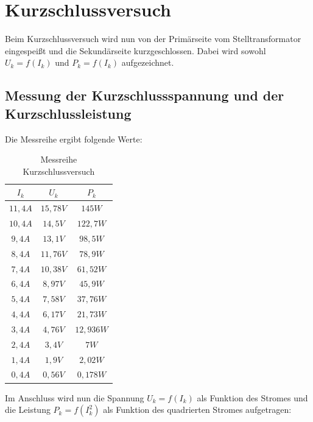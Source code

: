 \documentclass{article}
\begin{document}
\section{Kurzschlussversuch}
\label{sec:kurzschlussversuch}

Beim Kurzschlussversuch wird nun von der Primärseite vom Stelltransformator eingespeißt und die Sekundärseite kurzgeschlossen. Dabei wird sowohl $U_{k} = f(I_{k})$ und $P_{k} = f(I_{k})$ aufgezeichnet.

\subsection{Messung der Kurzschlussspannung und der Kurzschlussleistung}
\label{sec:mess-der-kurzschl}

Die Messreihe ergibt folgende Werte:

\begin{table}[h]
  \centering
  \begin{tabular}{|c|c|c|}
    \hline
    $I_{k}$ & $U_{k}$ & $P_{k}$ \\
    \hline
    $11,4A$ & $15,78V$ & $145W$ \\
    \hline
    $10,4A$ & $14,5V$ & $122,7W$ \\
    \hline
    $9,4A$ & $13,1V$ & $98,5W$ \\
    \hline
    $8,4A$ & $11,76V$ & $78,9W$ \\
    \hline
    $7,4A$ & $10,38V$ & $61,52W$\\
    \hline
    $6,4A$ & $8,97V$ & $45,9W$\\
    \hline
    $5,4A$ & $7,58V$ & $37,76W$\\
    \hline
    $4,4A$ & $6,17V$ & $21,73W$\\
    \hline
    $3,4A$ & $4,76V$ & $12,936W$\\
    \hline
    $2,4A$ & $3,4V$ & $7W$ \\
    \hline
    $1,4A$ & $1,9V$ & $2,02W$ \\
    \hline
    $0,4A$ & $0,56V$ & $0,178W$\\
    \hline
  \end{tabular}
  \caption{Messreihe Kurzschlussversuch}
  \label{tab:messkurz}
\end{table}


Im Anschluss wird nun die Spannung $U_{k} = f(I_{k})$ als Funktion des Stromes und die Leistung $P_{k} = f(I_{k}^{2})$ als Funktion des quadrierten Stromes aufgetragen:
\end{document}
